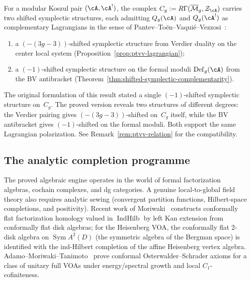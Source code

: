 \begin{theorem}\label{thm:lagrangian-complementarity}
For a modular Koszul pair $(\cA, \cA^!)$,
the complex
$C_g := R\Gamma(\overline{\mathcal{M}}_g, \mathcal{Z}_{\cA})$
carries two shifted symplectic structures, each admitting
$Q_g(\cA)$ and $Q_g(\cA^!)$ as complementary Lagrangians in the
sense of Pantev--To\"en--Vaqui\'e--Vezzosi~\cite{PTVV13}:
\begin{enumerate}[label=\textup{(\roman*)}]
\item a $(-(3g{-}3))$-shifted symplectic structure from
  Verdier duality on the center local system
  \textup{(}Proposition~\textup{\ref{prop:ptvv-lagrangian}}\textup{)};
\item a $(-1)$-shifted symplectic structure on the formal moduli
  $\mathrm{Def}_g(\cA)$ from the BV antibracket
  \textup{(}Theorem~\textup{\ref{thm:shifted-symplectic-complementarity}}\textup{)}.
\end{enumerate}
\end{theorem}

\begin{remark}\label{rem:lagrangian-conj-scope}
The original formulation of this result stated a single
$(-1)$-shifted symplectic structure on~$C_g$.  The proved version
reveals two structures of different degrees: the Verdier pairing
gives $(-(3g{-}3))$-shifted on~$C_g$ itself, while the BV
antibracket gives $(-1)$-shifted on the formal moduli.  Both support
the same Lagrangian polarization.
See Remark~\ref{rem:ptvv-relation} for the compatibility.
\end{remark}

\subsection{The analytic completion programme}
\label{subsec:analytic-completion-programme}

The proved algebraic engine operates in the world of formal
factorization algebras, cochain complexes, and dg categories.  A
genuine local-to-global field theory also requires analytic sewing
(convergent partition functions, Hilbert-space completions, and
positivity).  Recent work of
Moriwaki~\cite{Moriwaki26a, Moriwaki26b} constructs conformally flat
factorization homology valued in $\operatorname{IndHilb}$ by left Kan
extension from conformally flat disk algebras; for the Heisenberg
VOA, the conformally flat 2-disk algebra on
$\operatorname{Sym} A^2(D)$ (the symmetric algebra of the Bergman
space) is identified with the ind-Hilbert completion of the affine
Heisenberg vertex algebra.  Adamo--Moriwaki--Tanimoto~\cite{AMT24}
prove conformal Osterwalder--Schrader axioms for a class of unitary
full VOAs under energy/spectral growth and local $C_1$-cofiniteness.

